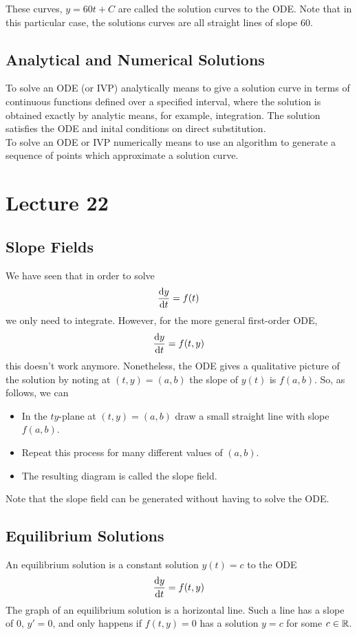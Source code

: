 \documentclass{report}
\begin{document}
These curves, $y=60t + C$ are called the solution curves to the ODE. Note that in this particular case, the solutions curves are all straight lines of slope 60.

\subsection*{Analytical and Numerical Solutions}
To solve an ODE (or IVP) analytically means to give a solution curve in terms of continuous functions defined over a specified interval, where the solution is obtained exactly by analytic means, for example, integration. The solution satisfies the ODE and inital conditions on direct substitution. \\

To solve an ODE or IVP numerically means to use an algorithm to generate a sequence of points which approximate a solution curve.

\section{Lecture 22}
\subsection*{Slope Fields}
We have seen that in order to solve
$$
	\frac{\mathrm{d} y}{\mathrm{d} t} = f(t)
$$
we only need to integrate. However, for the more general first-order ODE,
$$
	\frac{\mathrm{d} y}{\mathrm{d} t} = f(t,y)
$$
this doesn't work anymore. Nonetheless, the ODE gives a qualitative picture of the solution by noting at $(t,y)=(a,b)$ the slope of $y(t)$ is $f(a,b)$. So, as follows, we can
\begin{itemize}
	\item In the $ty$-plane at $(t,y)=(a,b)$ draw a small straight line with slope $f(a,b)$.
	\item Repeat this process for many different values of $(a,b)$.
	\item The resulting diagram is called the slope field.
\end{itemize} 
Note that the slope field can be generated without having to solve the ODE.


\subsection*{Equilibrium Solutions}
An equilibrium solution is a constant solution $y(t)=c$ to the ODE
$$
	\frac{\mathrm{d} y}{\mathrm{d} t} = f(t,y)
$$
The graph of an equilibrium solution is a horizontal line. Such a line has a slope of 0, $y'=0$, and only happens if $f(t,y)=0$ has a solution $y=c$ for some $c\in\mathbb{R}$.
\end{document}
